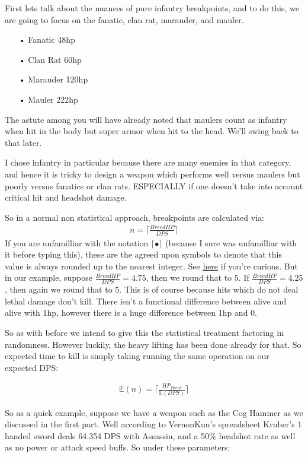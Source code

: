 \documentclass{article}
\begin{document}
First lets talk about the nuances of pure infantry breakpoints, and to do this, we are going to focus on the fanatic, clan rat, marauder, and mauler.

\begin{enumerate}
\item[•] Fanatic 48hp
\item[•] Clan Rat 60hp
\item[•] Marauder 120hp
\item[•] Mauler 222hp
\end{enumerate}

The astute among you will have already noted that maulers count as infantry when hit in the body but super armor when hit to the head. We'll swing back to that later.

I chose infantry in particular because there are many enemies in that category, and hence it is tricky to design a weapon which performs well versus maulers but poorly versus fanatics or clan rats. ESPECIALLY if one doesn't take into account critical hit and headshot damage.

So in a normal non statistical approach, breakpoints are calculated via:
\begin{align*}
n = \lceil \tfrac{Breed HP}{DPS} \rceil
\end{align*}
If you are unfamilliar with the notation $\lceil • \rceil$ (because I sure was unfamilliar with it before typing this), these are the agreed upon symbols to denote that this value is always rounded up to the nearest integer. See \href{https://en.wikipedia.org/wiki/Floor_and_ceiling_functions}{here} if you're curious. But in our example, suppose $\tfrac{Breed HP}{DPS} = 4.75$, then we round that to $5$. If $\tfrac{Breed HP}{DPS} = 4.25$, then again we round that to $5$. This is of course because hits which do not deal lethal damage don't kill. There isn't a functional difference between alive and alive with 1hp, however there is a huge difference between 1hp and 0.

So as with before we intend to give this the statistical treatment factoring in randomness. However luckily, the heavy lifting has been done already for that. So expected time to kill is simply taking running the same operation on our expected DPS:

\begin{align*}
\mathbb{E}(n) = \lceil \frac{HP_{Breed}}{\mathbb{E}(DPS)} \rceil
\end{align*}

So as a quick example, suppose we have a weapon such as the Cog Hammer as we discussed in the first part. Well according to VernonKun's spreadsheet Kruber's 1 handed sword deals 64.354 DPS with Assassin, and a 50\% headshot rate as well as no power or attack speed buffs. So under these parameters:
\end{document}
